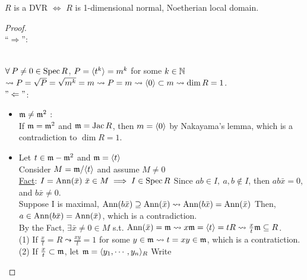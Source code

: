 \begin{prop} \label{dvr-equiv-condition}
  $R$ is a DVR $\iff$ $R$ is 1-dimensional normal, Noetherian local domain.
  \begin{proof} \hfill \\
    ``$\Rightarrow$'':
     \\
    $\forall P \neq 0 \in \Spec R$, $P = \langle t^k\rangle = m^k$ for some $k \in \mathbb{N}$
    $\leadsto P = \sqrt{P} = \sqrt{m^k} = m \leadsto P = m \leadsto
    \langle0\rangle \subset m \leadsto \dim R = 1$. \\
    $"\Leftarrow"$:
    \begin{itemize}
      \item $\mathfrak{m} \ne \mathfrak{m}^2$ : \\
        If $\mathfrak{m} = \mathfrak{m}^2$ and $\mathfrak{m} = \operatorname{Jac} R$, then $m = \langle0\rangle$ by Nakayama's lemma,
        which is a contradiction to $\dim R = 1$.
      \item Let $t \in \mathfrak{m} - \mathfrak{m}^2$ and $\mathfrak{m} = \langle t\rangle$ \\
        Consider $M = \mathfrak{m} / \langle t\rangle$ and assume $M \neq 0$ \\
        \underline{Fact}: $I = \operatorname{Ann}(\bar{x})\ \bar{x} \in M \implies I \in \operatorname{Spec} R$
        Since $ab \in I,\ a,b \notin I$, then $ab\bar{x} = 0$, 
        and $b\bar{x} \neq 0$. \\
        Suppose I is maximal, $\operatorname{Ann}(b\bar{x}) \supseteq \operatorname{Ann}(\bar{x})
        \leadsto \operatorname{Ann}(b\bar{x}) = \operatorname{Ann}(\bar{x})$ Then, $a \in \operatorname{Ann}(b\bar{x})
        = \operatorname{Ann}(\bar{x})$, which is a contradiction. \\
        By the Fact, $\exists \bar{x} \neq 0 \in M$ s.t. $\operatorname{Ann}(\bar{x}) = \mathfrak{m} \leadsto
        x\mathfrak{m} = \langle t\rangle = tR \leadsto \frac{x}{t}\mathfrak{m} \subseteq R$. \\
        (1) If $\frac{x}{t} = R \leadsto \frac{xy}{t} = 1$ for some $y \in \mathfrak{m}
        \leadsto t = xy \in \mathfrak{m}$, which is a contratiction. \\
        (2) If $\frac{x}{t} \subset \mathfrak{m}$, let $\mathfrak{m} = \langle y_1,\cdots, y_n\rangle_R$ Write

\end{itemize}
\end{proof}
\end{prop}
